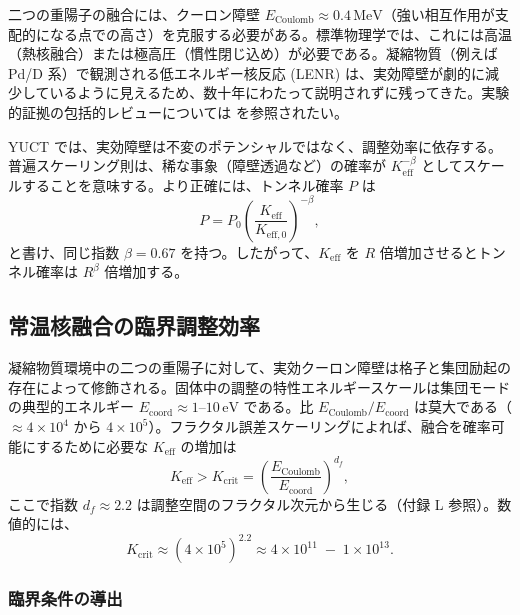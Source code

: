 \documentclass[12pt]{article}
\newcommand{\Keff}{K_{\mathrm{eff}}}
\newcommand{\Keffzero}{K_{\mathrm{eff},0}}
\newcommand{\df}{d_{\!f}}
\newcommand{\Kcrit}{K_{\mathrm{crit}}}
\theoremstyle{remark}
\begin{document}
	二つの重陽子の融合には、クーロン障壁 \(E_{\text{Coulomb}} \approx 0.4\,\text{MeV}\)（強い相互作用が支配的になる点での高さ）を克服する必要がある。標準物理学では、これには高温（熱核融合）または極高圧（慣性閉じ込め）が必要である。凝縮物質（例えば Pd/D 系）で観測される低エネルギー核反応 (LENR) は、実効障壁が劇的に減少しているように見えるため、数十年にわたって説明されずに残ってきた。実験的証拠の包括的レビューについては \cite{Storms2014, Nagel2019} を参照されたい。
	
	YUCT では、実効障壁は不変のポテンシャルではなく、調整効率に依存する。普遍スケーリング則は、稀な事象（障壁透過など）の確率が \(\Keff^{-\beta}\) としてスケールすることを意味する。より正確には、トンネル確率 \(P\) は
	\begin{equation}
		P = P_0 \left( \frac{\Keff}{\Keffzero} \right)^{-\beta},
		\label{eq:tunnel}
	\end{equation}
	と書け、同じ指数 \(\beta = 0.67\) を持つ。したがって、\(\Keff\) を \(R\) 倍増加させるとトンネル確率は \(R^{\beta}\) 倍増加する。
	
	\subsection{常温核融合の臨界調整効率}
	
	凝縮物質環境中の二つの重陽子に対して、実効クーロン障壁は格子と集団励起の存在によって修飾される。固体中の調整の特性エネルギースケールは集団モードの典型的エネルギー \(E_{\mathrm{coord}} \approx 1\)–\(10\,\text{eV}\) である。比 \(E_{\text{Coulomb}}/E_{\mathrm{coord}}\) は莫大である（\(\approx 4\times10^4\) から \(4\times10^5\)）。フラクタル誤差スケーリングによれば、融合を確率可能にするために必要な \(\Keff\) の増加は
	\begin{equation}
		\Keff > \Kcrit = \left( \frac{E_{\text{Coulomb}}}{E_{\mathrm{coord}}} \right)^{\df},
		\label{eq:Kcrit}
	\end{equation}
	ここで指数 \(\df \approx 2.2\) は調整空間のフラクタル次元から生じる（付録 L 参照）。数値的には、
	\[
	\Kcrit \approx (4\times10^5)^{2.2} \approx 4\times10^{11} \;-\; 1\times10^{13}.
	\]
	
	\subsubsection{臨界条件の導出}
	
\end{document}
